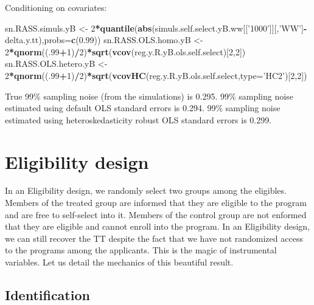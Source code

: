 \documentclass[]{book}
\newenvironment{Shaded}{\begin{snugshade}}{\end{snugshade}}
\newcommand{\KeywordTok}[1]{\textcolor[rgb]{0.13,0.29,0.53}{\textbf{#1}}}
\newcommand{\DataTypeTok}[1]{\textcolor[rgb]{0.13,0.29,0.53}{#1}}
\newcommand{\DecValTok}[1]{\textcolor[rgb]{0.00,0.00,0.81}{#1}}
\newcommand{\FloatTok}[1]{\textcolor[rgb]{0.00,0.00,0.81}{#1}}
\newcommand{\StringTok}[1]{\textcolor[rgb]{0.31,0.60,0.02}{#1}}
\newcommand{\OperatorTok}[1]{\textcolor[rgb]{0.81,0.36,0.00}{\textbf{#1}}}
\newcommand{\NormalTok}[1]{#1}
\theoremstyle{definition}
\theoremstyle{definition}
\theoremstyle{definition}
\theoremstyle{remark}
\begin{document}
Conditioning on covariates:

\begin{Shaded}
\begin{Highlighting}[]
\NormalTok{sn.RASS.simuls.yB <-}\StringTok{ }\DecValTok{2}\OperatorTok{*}\KeywordTok{quantile}\NormalTok{(}\KeywordTok{abs}\NormalTok{(simuls.self.select.yB.ww[[}\StringTok{'1000'}\NormalTok{]][,}\StringTok{'WW'}\NormalTok{]}\OperatorTok{-}\NormalTok{delta.y.tt),}\DataTypeTok{probs=}\KeywordTok{c}\NormalTok{(}\FloatTok{0.99}\NormalTok{))}
\NormalTok{sn.RASS.OLS.homo.yB <-}\StringTok{ }\DecValTok{2}\OperatorTok{*}\KeywordTok{qnorm}\NormalTok{((.}\DecValTok{99}\OperatorTok{+}\DecValTok{1}\NormalTok{)}\OperatorTok{/}\DecValTok{2}\NormalTok{)}\OperatorTok{*}\KeywordTok{sqrt}\NormalTok{(}\KeywordTok{vcov}\NormalTok{(reg.y.R.yB.ols.self.select)[}\DecValTok{2}\NormalTok{,}\DecValTok{2}\NormalTok{])}
\NormalTok{sn.RASS.OLS.hetero.yB <-}\StringTok{ }\DecValTok{2}\OperatorTok{*}\KeywordTok{qnorm}\NormalTok{((.}\DecValTok{99}\OperatorTok{+}\DecValTok{1}\NormalTok{)}\OperatorTok{/}\DecValTok{2}\NormalTok{)}\OperatorTok{*}\KeywordTok{sqrt}\NormalTok{(}\KeywordTok{vcovHC}\NormalTok{(reg.y.R.yB.ols.self.select,}\DataTypeTok{type=}\StringTok{'HC2'}\NormalTok{)[}\DecValTok{2}\NormalTok{,}\DecValTok{2}\NormalTok{])}
\end{Highlighting}
\end{Shaded}

True 99\% sampling noise (from the simulations) is 0.295. 99\% sampling
noise estimated using default OLS standard errors is 0.294. 99\%
sampling noise estimated using heteroskedasticity robust OLS standard
errors is 0.299.

\section{Eligibility design}\label{sec:design3}

In an Eligibility design, we randomly select two groups among the
eligibles. Members of the treated group are informed that they are
eligible to the program and are free to self-select into it. Members of
the control group are not enformed that they are eligible and cannot
enroll into the program. In an Eligibility design, we can still recover
the TT despite the fact that we have not randomized access to the
programs among the applicants. This is the magic of instrumental
variables. Let us detail the mechanics of this beautiful result.

\subsection{Identification}\label{identification-2}
\end{document}
